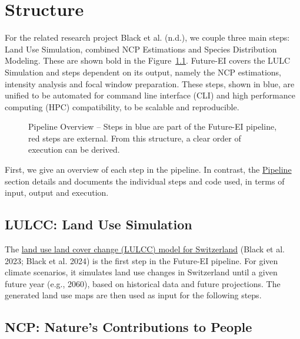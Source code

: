 \documentclass[
  letterpaper,
  DIV=11,
  numbers=noendperiod]{scrreprt}
\begin{document}

\chapter{Structure}\label{structure}

For the related research project Black et al. (n.d.), we couple three
main steps: Land Use Simulation, combined NCP Estimations and Species
Distribution Modeling. These are shown bold in the
Figure~\ref{fig-pipeline}. Future-EI covers the LULC Simulation and
steps dependent on its output, namely the NCP estimations, intensity
analysis and focal window preparation. These steps, shown in blue, are
unified to be automated for command line interface (CLI) and high
performance computing (HPC) compatibility, to be scalable and
reproducible.

\begin{figure}


\caption{\label{fig-pipeline}Pipeline Overview -- Steps in blue are part
of the Future-EI pipeline, red steps are external. From this structure,
a clear order of execution can be derived.}

\end{figure}%

First, we give an overview of each step in the pipeline. In contrast,
the \hyperref[pipeline]{Pipeline} section details and documents the
individual steps and code used, in terms of input, output and execution.

\section{LULCC: Land Use Simulation}\label{lulcc-land-use-simulation}

The \href{https://github.com/blenback/LULCC-CH}{land use land cover
change (LULCC) model for Switzerland} (Black et al. 2023; Black et al.
2024) is the first step in the Future-EI pipeline. For given climate
scenarios, it simulates land use changes in Switzerland until a given
future year (e.g., 2060), based on historical data and future
projections. The generated land use maps are then used as input for the
following steps.

\section{NCP: Nature's Contributions to
People}\label{ncp-natures-contributions-to-people}
\end{document}
